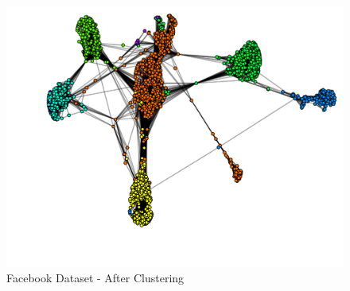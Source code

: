 \begin{figure}[H]
	\centering
	\includegraphics[scale=0.4, trim=0 0 20 0]{Images/after_facebook.pdf}
	\caption{Facebook Dataset - After Clustering\label{fig:fb-after}}
\end{figure}
